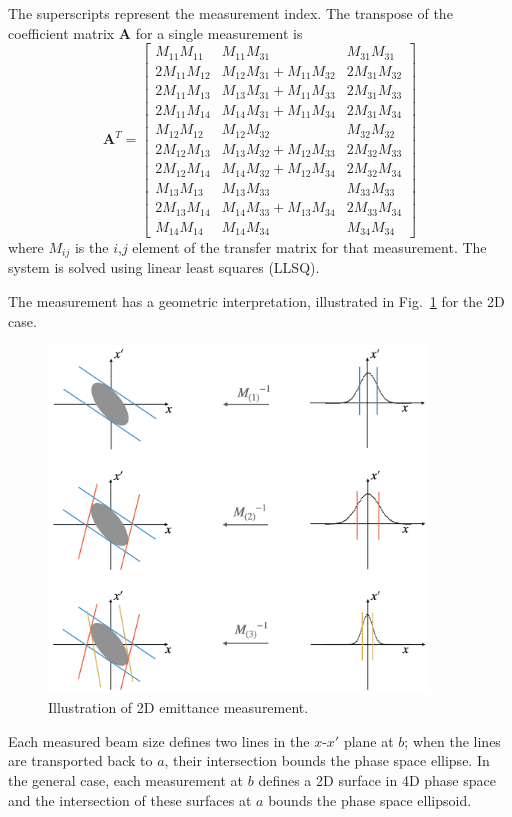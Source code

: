 %
The superscripts represent the measurement index. The transpose of the coefficient matrix $\mathbf{A}$ for a single measurement is
%
\begin{equation}
    \mathbf{A}^T = 
    \begin{bmatrix}
        M_{11}M_{11} & M_{11}M_{31} & M_{31}M_{31} \\
        2M_{11}M_{12} & M_{12}M_{31} + M_{11}M_{32} & 2M_{31}M_{32} \\
        2M_{11}M_{13} & M_{13}M_{31} + M_{11}M_{33} & 2M_{31}M_{33} \\
        2M_{11}M_{14} & M_{14}M_{31} + M_{11}M_{34} & 2M_{31}M_{34} \\
        M_{12}M_{12} & M_{12}M_{32} & M_{32}M_{32} \\
        2M_{12}M_{13} & M_{13}M_{32} + M_{12}M_{33} & 2M_{32}M_{33} \\
        2M_{12}M_{14} & M_{14}M_{32} + M_{12}M_{34} & 2M_{32}M_{34} \\
        M_{13}M_{13} & M_{13}M_{33} & M_{33}M_{33} \\
        2M_{13}M_{14} & M_{14}M_{33} + M_{13}M_{34} & 2M_{33}M_{34} \\
        M_{14}M_{14} & M_{14}M_{34} & M_{34}M_{34}
    \end{bmatrix}
\end{equation}
%
where $M_{ij}$ is the $i$,$j$ element of the transfer matrix for that measurement. The system is solved using linear least squares (LLSQ). 

The measurement has a geometric interpretation, illustrated in Fig.~\ref{fig:ws_emittance_measurement} for the 2D case.
%
\begin{figure}[!p]
    \centering
    \includegraphics[width=0.9\textwidth]{Images/chapter4/ws_emittance_measurement2.png}
    \caption{Illustration of 2D emittance measurement.}
    \label{fig:ws_emittance_measurement}
\end{figure}
%
Each measured beam size defines two lines in the $x$-$x'$ plane at $b$; when the lines are transported back to $a$, their intersection bounds the phase space ellipse. In the general case, each measurement at $b$ defines a 2D surface in 4D phase space and the intersection of these surfaces at $a$ bounds the phase space ellipsoid.


